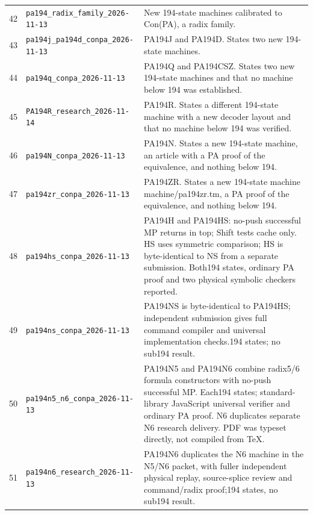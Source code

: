 {\begin{longtable}{rp{}p{}}
42&\nolinkurl{pa194_radix_family_2026-11-13}&New 194-state machines calibrated to Con(PA), a radix family.\\[3pt]
43&\nolinkurl{pa194j_pa194d_conpa_2026-11-13}&PA194J and PA194D. States two new 194-state machines.\\[3pt]
44&\nolinkurl{pa194q_conpa_2026-11-13}&PA194Q and PA194CSZ. States two new 194-state machines and that no machine below 194 was established.\\[3pt]
45&\nolinkurl{PA194R_research_2026-11-14}&PA194R. States a different 194-state machine with a new decoder layout and that no machine below 194 was verified.\\[3pt]
46&\nolinkurl{pa194N_conpa_2026-11-13}&PA194N. States a new 194-state machine, an article with a PA proof of the equivalence, and nothing below 194.\\[3pt]
47&\nolinkurl{pa194zr_conpa_2026-11-13}&PA194ZR. States a new 194-state machine machine/pa194zr.tm, a PA proof of the equivalence, and nothing below 194.\\[3pt]
48&\nolinkurl{pa194hs_conpa_2026-11-13}&PA194H and PA194HS: no-push successful MP returns in top; Shift tests cache only. HS uses symmetric comparison; HS is byte-identical to NS from a separate submission. Both194 states, ordinary PA proof and two physical symbolic checkers reported.\\[3pt]
49&\nolinkurl{pa194ns_conpa_2026-11-13}&PA194NS is byte-identical to PA194HS; independent submission gives full command compiler and universal implementation checks.194 states; no sub194 result.\\[3pt]
50&\nolinkurl{pa194n5_n6_conpa_2026-11-13}&PA194N5 and PA194N6 combine radix5/6 formula constructors with no-push successful MP. Each194 states; standard-library JavaScript universal verifier and ordinary PA proof. N6 duplicates separate N6 research delivery. PDF was typeset directly, not compiled from TeX.\\[3pt]
51&\nolinkurl{pa194n6_research_2026-11-13}&PA194N6 duplicates the N6 machine in the N5/N6 packet, with fuller independent physical replay, source-splice review and command/radix proof;194 states, no sub194 result.\\[3pt]
\bottomrule\end{longtable}
}
